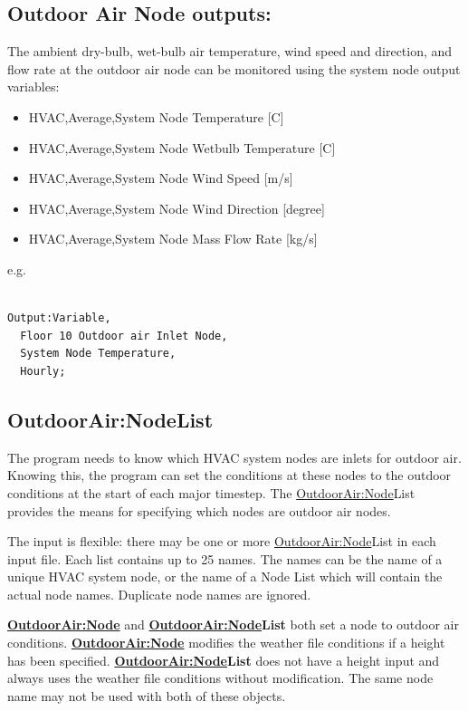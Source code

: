 \subsection{Outdoor Air Node outputs:}\label{outdoor-air-node-outputs}

The ambient dry-bulb, wet-bulb air temperature, wind speed and direction, and flow rate at the outdoor air node can be monitored using the system node output variables:

\begin{itemize}
\item
  HVAC,Average,System Node Temperature {[}C{]}
\item
  HVAC,Average,System Node Wetbulb Temperature {[}C{]}
\item
  HVAC,Average,System Node Wind Speed {[}m/s{]}
\item
  HVAC,Average,System Node Wind Direction {[}degree{]}
\item
  HVAC,Average,System Node Mass Flow Rate {[}kg/s{]}
\end{itemize}

e.g.

\begin{lstlisting}

Output:Variable,
  Floor 10 Outdoor air Inlet Node,
  System Node Temperature,
  Hourly;
\end{lstlisting}


\subsection{OutdoorAir:NodeList}\label{outdoorairnodelist}

The program needs to know which HVAC system nodes are inlets for outdoor air. Knowing this, the program can set the conditions at these nodes to the outdoor conditions at the start of each major timestep. The \hyperref[outdoorairnode]{OutdoorAir:Node}List provides the means for specifying which nodes are outdoor air nodes.

The input is flexible: there may be one or more \hyperref[outdoorairnode]{OutdoorAir:Node}List in each input file. Each list contains up to 25 names. The names can be the name of a unique HVAC system node, or the name of a Node List which will contain the actual node names. Duplicate node names are ignored.

\textbf{\hyperref[outdoorairnode]{OutdoorAir:Node}} and \textbf{\hyperref[outdoorairnode]{OutdoorAir:Node}List} both set a node to outdoor air conditions. \textbf{\hyperref[outdoorairnode]{OutdoorAir:Node}} modifies the weather file conditions if a height has been specified. \textbf{\hyperref[outdoorairnode]{OutdoorAir:Node}List} does not have a height input and always uses the weather file conditions without modification. The same node name may not be used with both of these objects.

